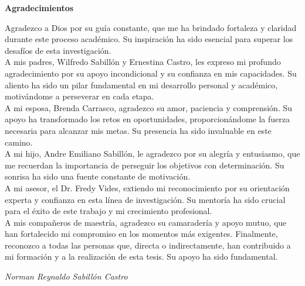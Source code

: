 \let\cleardoublepage\clearpage
{}

\begin{center}{
    \large \bf Agradecimientos}
  \end{center}

Agradezco a Dios por su guía constante, que me ha brindado fortaleza y claridad durante este proceso académico. Su inspiración ha sido esencial para superar los desafíos de esta investigación.\\

A mis padres, Wilfredo Sabillón y Ernestina Castro, les expreso mi profundo agradecimiento por su apoyo incondicional y su confianza en mis capacidades. Su aliento ha sido un pilar fundamental en mi desarrollo personal y académico, motivándome a perseverar en cada etapa.\\

A mi esposa, Brenda Carrasco, agradezco su amor, paciencia y comprensión. Su apoyo ha transformado los retos en oportunidades, proporcionándome la fuerza necesaria para alcanzar mis metas. Su presencia ha sido invaluable en este camino.\\

A mi hijo, Andre Emiliano Sabillón, le agradezco por su alegría y entusiasmo, que me recuerdan la importancia de perseguir los objetivos con determinación. Su sonrisa ha sido una fuente constante de motivación.\\

A mi asesor, el Dr. Fredy Vides, extiendo mi reconocimiento por su orientación experta y confianza en esta línea de investigación. Su mentoría ha sido crucial para el éxito de este trabajo y mi crecimiento profesional.\\

A mis compañeros de maestría, agradezco su camaradería y apoyo mutuo, que han fortalecido mi compromiso en los momentos más exigentes. Finalmente, reconozco a todas las personas que, directa o indirectamente, han contribuido a mi formación y a la realización de esta tesis. Su apoyo ha sido fundamental.

\begin{flushright}
\textit{Norman Reynaldo Sabillón Castro}
\end{flushright}
